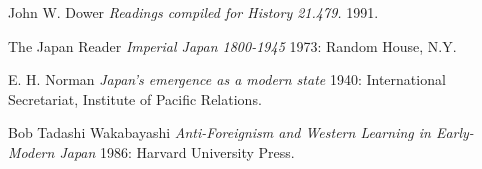 \documentclass[titlepage]{article}
\begin{document}
  \begin{thebibliography}{1}

   John W. Dower {\em Readings compiled for History
  21.479.}  1991.

    The Japan Reader {\em Imperial Japan 1800-1945} 1973:
  Random House, N.Y.

   E. H. Norman {\em Japan's emergence as a modern
  state} 1940: International Secretariat, Institute of Pacific
  Relations.

   Bob Tadashi Wakabayashi {\em Anti-Foreignism and Western
  Learning in Early-Modern Japan} 1986: Harvard University Press.

  \end{thebibliography}
\end{document}
